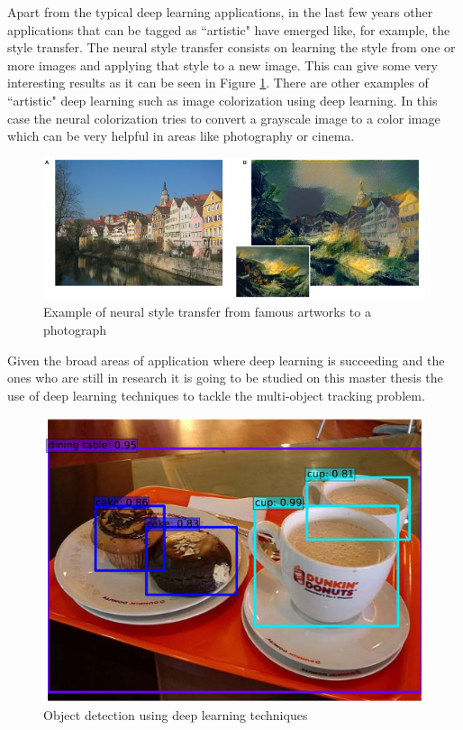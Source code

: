 Apart from the typical deep learning applications, in the last few years other applications that can be tagged as ``artistic" have emerged like, for example, the style transfer. The neural style transfer consists on learning the style from one or more images and applying that style to a new image. This can give some very interesting results as it can be seen in Figure \ref{style_transfer}. There are other examples of ``artistic" deep learning such as image colorization using deep learning. In this case the neural colorization tries to convert a grayscale image to a color image which can be very helpful in areas like photography or cinema.
\begin{figure}[H]
\begin{center}
\includegraphics[scale=0.4]{figures/style_transfer.png}
\caption{Example of neural style transfer from famous artworks to a photograph \cite{gatys2015neural}}
\label{style_transfer}
\end{center}
\end{figure}
Given the broad areas of application where deep learning is succeeding and the ones who are still in research it is going to be studied on this master thesis the use of deep learning techniques to tackle the multi-object tracking problem.
\begin{figure}[H]
\begin{center}
\includegraphics[scale=0.35]{figures/ssd_detection.png}
\caption{Object detection using deep learning techniques \cite{liu2016ssd}}
\label{fig:ssd_detection}
\end{center}
\end{figure}
